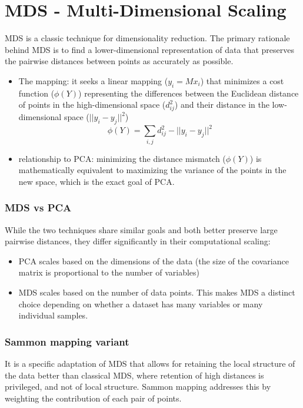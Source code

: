 \section{MDS - Multi-Dimensional Scaling}
MDS is a classic technique for dimensionality reduction. The primary rationale behind MDS is to find a lower-dimensional representation of data that preserves the pairwise distances between points as accurately as possible.
\begin{itemize}
    \item The mapping: it seeks a linear mapping (\(y_i = Mx_i\)) that minimizes a cost function (\(\phi(Y)\)) representing the differences between the Euclidean distance of points in the high-dimensional space (\(d_{ij}^2\)) and their distance in the low-dimensional space (\(||y_i - y_j||^2\))
    \begin{equation}
        \phi(Y) = \sum_{i, j} d^2_{ij} - || y_i - y_j||^2
    \end{equation}
    \item relationship to PCA: minimizing the distance mismatch (\(\phi(Y)\)) is mathematically equivalent to maximizing the variance of the points in the new space, which is the exact goal of PCA.
\end{itemize}

\subsubsection{MDS vs PCA}
While the two techniques share similar goals and both better preserve large pairwise distances, they differ significantly in their computational scaling:
\begin{itemize}
    \item PCA scales based on the dimensions of the data (the size of the covariance matrix is proportional to the number of variables)
    \item MDS scales based on the number of data points. This makes MDS a distinct choice depending on whether a dataset has many variables or many individual samples.
\end{itemize}

\subsubsection{Sammon mapping variant}
It is a specific adaptation of MDS that allows for retaining the local structure of the data better than classical MDS, where retention of high distances is privileged, and not of local structure. Sammon mapping addresses this by weighting the contribution of each pair of points.

